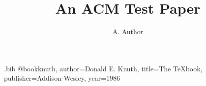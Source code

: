 \begin{filecontents*}[overwrite]{\jobname.bib}
@book{knuth, author={Donald E. Knuth}, title={The {\TeX}book}, publisher={Addison-Wesley}, year={1986}}
\end{filecontents*}
\documentclass[sigconf]{acmart}
\renewcommand\footnotetextcopyrightpermission[1]{}

\title{An ACM Test Paper}
\author{A. Author}
\begin{abstract}
A short abstract.
\end{abstract}
\maketitle
\section{Introduction}
As \citet{knuth} explains, $\sum_{i=1}^n i = $; \texttt{monospace} too.



